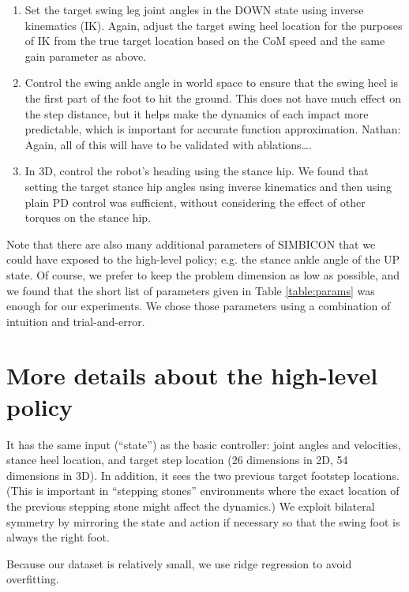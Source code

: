 \documentclass[a4paper]{article}
\newcommand{\nhatch}[1]{{\leavevmode\color{magenta} Nathan: #1}}
\begin{document}
\begin{enumerate}
  \item Set the target swing leg joint angles in the DOWN state using inverse kinematics (IK).
    Again, adjust the target swing heel location for the purposes of IK from the true target location based on the CoM speed and the same gain parameter as above.

  \item Control the swing ankle angle in world space to ensure that the swing heel is the first part of the foot to hit the ground.
    This does not have much effect on the step distance, but it helps make the dynamics of each impact more predictable, which is important for accurate function approximation.
    \nhatch{Again, all of this will have to be validated with ablations\dots.}

  \item In 3D, control the robot's heading using the stance hip.
    We found that setting the target stance hip angles using inverse kinematics and then using plain PD control was sufficient, without considering the effect of other torques on the stance hip.
\end{enumerate}

Note that there are also many additional parameters of SIMBICON that we could have exposed to the high-level policy; e.g. the stance ankle angle of the UP state.
Of course, we prefer to keep the problem dimension as low as possible, and we found that the short list of parameters given in Table \ref{table:params} was enough for our experiments.
We chose those parameters using a combination of intuition and trial-and-error.

\section{More details about the high-level policy}

It has the same input (``state'') as the basic controller: joint angles and velocities, stance heel location, and target step location (26 dimensions in 2D, 54 dimensions in 3D).
In addition, it sees the two previous target footstep locations.
(This is important in ``stepping stones'' environments where the exact location of the previous stepping stone might affect the dynamics.)
We exploit bilateral symmetry by mirroring the state and action if necessary so that the swing foot is always the right foot.

Because our dataset is relatively small, we use ridge regression to avoid overfitting.
\end{document}
